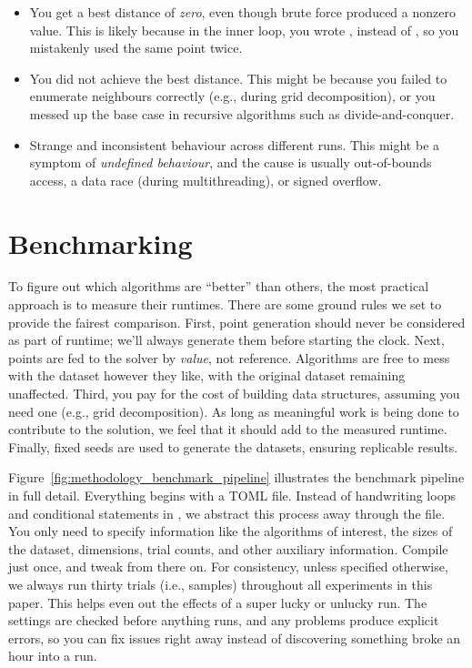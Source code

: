 \begin{itemize}
    \item You get a best distance of \textit{zero}, even though brute force produced a nonzero value.
    This is likely because in the inner loop, you wrote , instead of ,
    so you mistakenly used the same point twice.
    \item You did not achieve the best distance. This might be because you failed to enumerate neighbours
    correctly (e.g., during grid decomposition), or you messed up the base case in recursive algorithms
    such as divide-and-conquer.
    \item Strange and inconsistent behaviour across different runs. This might be a symptom of
    \textit{undefined behaviour}, and the cause is usually out-of-bounds access, a data race (during
    multithreading), or signed overflow.
\end{itemize}

\section{Benchmarking}

To figure out which algorithms are ``better'' than others, the most practical approach
is to measure their runtimes. There are some ground rules we set to provide the fairest
comparison. First, point generation should never be considered as part of runtime; we'll
always generate them before starting the clock. Next, points are fed to the solver by
\textit{value}, not reference. Algorithms are free to mess with the dataset however they like,
with the original dataset remaining unaffected. Third, you pay for the cost of building data
structures, assuming you need one (e.g., grid decomposition). As long as meaningful work is being
done to contribute to the solution, we feel that it should add to the measured runtime. Finally, fixed seeds
are used to generate the datasets, ensuring replicable results.

Figure~\ref{fig:methodology_benchmark_pipeline} illustrates the benchmark pipeline in full detail. Everything
begins with a TOML file. Instead of handwriting loops and conditional statements in , we
abstract this process away through the  file. You only need to specify information like
the algorithms of interest, the sizes of the dataset, dimensions, trial counts, and other auxiliary information.
Compile just once, and tweak  from there on. For consistency, unless specified otherwise,
we always run thirty trials (i.e., samples) throughout all experiments in this paper. This helps even out
the effects of a super lucky or unlucky run. The settings are checked before anything runs, and any problems produce
explicit errors, so you can fix issues right away instead of discovering something broke an hour
into a run.

